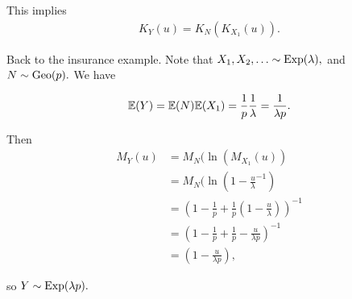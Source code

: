 \begin{eg}
This implies
\begin{align*}
    K_Y(u)=K_N(K_{X_1}(u)).
\end{align*}

Back to the insurance example. Note that $X_1,X_2,\ldots\sim \operatorname*{Exp}(\lambda),$ and $N\sim \operatorname*{Geo}(p).$ We have

$$
\mathbb E(Y)=\mathbb E(N)\mathbb E(X_1)=\frac{1}{p}\frac{1}{\lambda}=\frac{1}{\lambda p}.
$$

Then 
\begin{align*}
    M_Y(u)&=M_N(\ln(M_{X_1}(u)) \\
    &=M_N(\ln(1-\frac{u}{\lambda}^{-1}) \\
    &=\left(1-\frac1p+\frac{1}{p}\left(1-\frac{u}{\lambda}\right)\right)^{-1} \\
    &=\left(1-\frac{1}{p}+\frac{1}{p}-\frac{u}{\lambda p}\right)^{-1} \\
    &=\left(1-\frac{u}{\lambda p}\right),
\end{align*}
 
so $Y\sim \operatorname*{Exp}(\lambda p).$
\end{eg}

